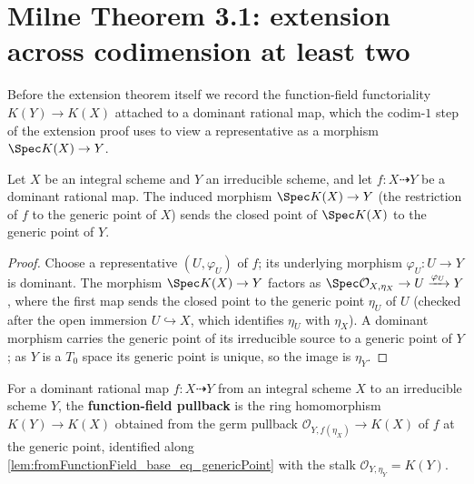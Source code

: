 \section{Milne Theorem 3.1: extension across codimension at least two}
\label{sec:milne_thm31}

Before the extension theorem itself we record the function-field functoriality
\(K(Y) \to K(X)\) attached to a dominant rational map, which the codim-\(1\) step of
the extension proof uses to view a representative as a morphism \(\Spec K(X) \to Y\).

\begin{lemma}\leanok
  \label{lem:fromFunctionField_base_eq_genericPoint}
  Let \(X\) be an integral scheme and \(Y\) an irreducible scheme, and let
  \(f \colon X \dashrightarrow Y\) be a dominant rational map. The induced morphism
  \(\Spec K(X) \to Y\) (the restriction of \(f\) to the generic point of \(X\))
  sends the closed point of \(\Spec K(X)\) to the generic point of \(Y\).
\end{lemma}

\begin{proof}\leanok
  Choose a representative \((U, \varphi_U)\) of \(f\); its underlying morphism
  \(\varphi_U \colon U \to Y\) is dominant. The morphism \(\Spec K(X) \to Y\) factors as
  \(\Spec \mathcal O_{X,\eta_X} \to U \xrightarrow{\varphi_U} Y\), where the first map
  sends the closed point to the generic point \(\eta_U\) of \(U\) (checked after the open
  immersion \(U \hookrightarrow X\), which identifies \(\eta_U\) with \(\eta_X\)). A
  dominant morphism carries the generic point of its irreducible source to a generic
  point of \(Y\); as \(Y\) is a \(T_0\) space its generic point is unique, so the image
  is \(\eta_Y\).
\end{proof}

\begin{definition}\leanok
  \label{def:functionFieldPullback}
  For a dominant rational map \(f \colon X \dashrightarrow Y\) from an integral scheme
  \(X\) to an irreducible scheme \(Y\), the \textbf{function-field pullback} is the ring
  homomorphism \(K(Y) \to K(X)\) obtained from the germ pullback
  \(\mathcal O_{Y, f(\eta_X)} \to K(X)\) of \(f\) at the generic point, identified along
  \cref{lem:fromFunctionField_base_eq_genericPoint} with the stalk
  \(\mathcal O_{Y,\eta_Y} = K(Y)\).
\end{definition}

